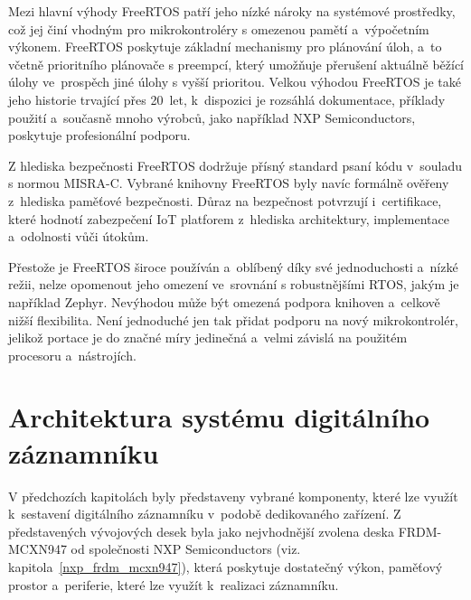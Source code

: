 Mezi hlavní výhody FreeRTOS patří jeho nízké nároky na systémové prostředky, což jej činí vhodným pro mikrokontroléry s omezenou pamětí a~výpočetním výkonem. FreeRTOS poskytuje základní mechanismy pro plánování úloh, a~to včetně prioritního plánovače s preempcí, který umožňuje přerušení aktuálně běžící úlohy ve~prospěch jiné úlohy s vyšší prioritou. Velkou výhodou FreeRTOS je také jeho historie trvající přes 20~let, k~dispozici je rozsáhlá dokumentace, příklady použití a~současně mnoho výrobců, jako například NXP Semiconductors, poskytuje profesionální podporu.~\cite{freertos_book, the_architecture_of_open_source_applications}


Z hlediska bezpečnosti FreeRTOS dodržuje přísný standard psaní kódu v~souladu s normou MISRA-C. Vybrané knihovny FreeRTOS byly navíc formálně ověřeny z~hlediska paměťové bezpečnosti. Důraz na bezpečnost potvrzují i~certifikace, které hodnotí zabezpečení IoT platforem z~hlediska architektury, implementace a~odolnosti vůči útokům.~\cite{freertos_security}


Přestože je FreeRTOS široce používán a~oblíbený díky své jednoduchosti a~nízké režii, nelze opomenout jeho omezení ve~srovnání s robustnějšími RTOS, jakým je například Zephyr. Nevýhodou může být omezená podpora knihoven a~celkově nižší flexibilita. Není jednoduché jen tak přidat podporu na nový mikrokontrolér, jelikož portace je do značné míry jedinečná a~velmi závislá na použitém procesoru a~nástrojích.~\cite{freertos_portability, freertos_vs_zephyr}



\section{Architektura systému digitálního záznamníku}
\label{architektura_systemu_digitalniho_zaznamniku}
V předchozích kapitolách byly představeny vybrané komponenty, které lze využít k~sestavení digitálního záznamníku v~podobě dedikovaného zařízení. Z představených vývojových desek byla jako nejvhodnější zvolena deska FRDM-MCXN947 od společnosti NXP Semiconductors (viz. kapitola~\ref{nxp_frdm_mcxn947}), která poskytuje dostatečný výkon, paměťový prostor a~periferie, které lze využít k~realizaci záznamníku.

